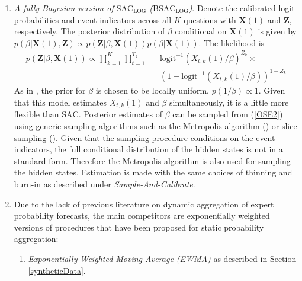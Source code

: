 \documentclass[aoas, preprint]{imsart}
\numberwithin{equation}{section}
\theoremstyle{plain}
\newcommand{\logit}{\text{logit}}
\begin{document}
\begin{enumerate}
\item \textit{A fully Bayesian version of $\text{SAC}_{\text{LOG}}$ ($\text{BSAC}_{\text{LOG}}$)}. Denote the calibrated logit-probabilities and event indicators across all $K$ questions with $\boldsymbol{X}(1)$ and $\boldsymbol{Z}$, respectively.  The posterior distribution of $\beta$ conditional on $\boldsymbol{X}(1)$ is given by $p(\beta | \boldsymbol{X}(1), \boldsymbol{Z}) \propto p( \boldsymbol{Z} | \beta, \boldsymbol{X}(1)) p(\beta | \boldsymbol{X}(1))$. The likelihood is
\begin{eqnarray}
p( \boldsymbol{Z} | \beta, \boldsymbol{X}(1)) \propto \prod_{k=1}^K \prod_{t=1}^{T_k} && \logit^{-1} \left(X_{t,k}(1)/\beta  \right)^{Z_k}\times \label{OSE2}\\ 
&& \left( 1-  \logit^{-1} \left( X_{t,k}(1)/\beta  \right) \right)^{1-Z_k} \nonumber
\end{eqnarray}
As in \citet{gelman2003bayesian}, the prior for $\beta$ is chosen to be locally uniform, $p(1/\beta) \propto 1$. Given that this model estimates $X_{t,k}(1)$ and $\beta$ simultaneously, it is a little more flexible than $\text{SAC}$.  Posterior estimates of $\beta$ can be sampled from (\ref{OSE2}) using generic sampling algorithms such as the Metropolis algorithm (\citet{metropolis1953equation}) or slice sampling (\citet{neal2003slice}). Given that the sampling procedure conditions on the event indicators, the full conditional distribution of the hidden states is not in a standard form. Therefore the Metropolis algorithm is also used for sampling the hidden states. Estimation is made with the same choices of thinning and burn-in as described under \textit{Sample-And-Calibrate}. 




\item Due to the lack of previous literature on dynamic aggregation of expert probability forecasts,  the main competitors are exponentially weighted versions of procedures that have been proposed for static probability aggregation:

\begin{enumerate}

\item \textit{Exponentially Weighted Moving Average (EWMA)} as described in Section \ref{syntheticData}.
 

\end{enumerate}
\end{enumerate}
\end{document}
